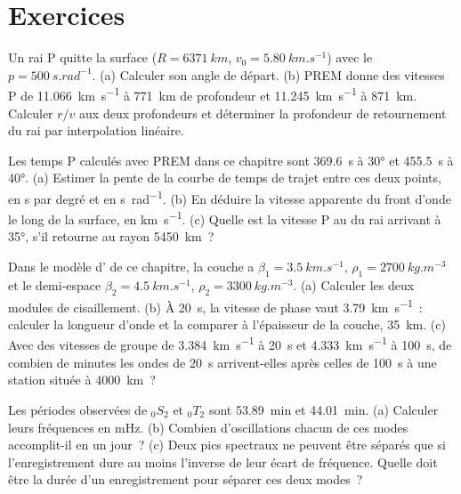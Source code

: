 \section{Exercices}

\begin{exercise}[$\star$]\label{exo:b3:seismology-imaging:1}
Un rai P quitte la surface ($R = \qty{6371}{km}$, $v_0 = \qty{5.80}{km.s^{-1}}$)
avec le  $p = \qty{500}{s.rad^{-1}}$. (a) Calculer son angle de départ.
(b) PREM donne des vitesses P de \qty{11.066}{km.s^{-1}} à \qty{771}{km} de profondeur
et \qty{11.245}{km.s^{-1}} à \qty{871}{km}. Calculer $r/v$ aux deux profondeurs et
déterminer la profondeur de retournement du rai par interpolation linéaire.
\end{exercise}

\begin{exercise}[$\star$]\label{exo:b3:seismology-imaging:2}
Les temps P calculés avec PREM dans ce chapitre sont \qty{369.6}{s} à \ang{30}
et \qty{455.5}{s} à \ang{40}. (a) Estimer la pente de la courbe de temps de trajet
entre ces deux points, en \unit{s} par degré et en \unit{s.rad^{-1}}. (b) En déduire
la vitesse apparente du front d'onde le long de la surface, en
\unit{km.s^{-1}}. (c) Quelle est la vitesse P au  du rai
arrivant à \ang{35}, s'il retourne au rayon \qty{5450}{km}~?
\end{exercise}

\begin{exercise}[$\star$]\label{exo:b3:seismology-imaging:3}
Dans le modèle d' de ce chapitre, la couche a $\beta_1 =
\qty{3.5}{km.s^{-1}}$, $\rho_1 = \qty{2700}{kg.m^{-3}}$ et le demi-espace
$\beta_2 = \qty{4.5}{km.s^{-1}}$, $\rho_2 = \qty{3300}{kg.m^{-3}}$.
(a) Calculer les deux modules de cisaillement. (b) À \qty{20}{s}, la vitesse de phase vaut
\qty{3.79}{km.s^{-1}}~: calculer la longueur d'onde et la comparer à l'épaisseur de la couche,
\qty{35}{km}. (c) Avec des vitesses de groupe de \qty{3.384}{km.s^{-1}} à
\qty{20}{s} et \qty{4.333}{km.s^{-1}} à \qty{100}{s}, de combien de minutes les
ondes de 20~s arrivent-elles après celles de 100~s à une station située à \qty{4000}{km}~?
\end{exercise}

\begin{exercise}[$\star$]\label{exo:b3:seismology-imaging:4}
Les périodes observées de ${}_0S_2$ et ${}_0T_2$ sont \qty{53.89}{min} et
\qty{44.01}{min}. (a) Calculer leurs fréquences en \unit{mHz}. (b) Combien d'oscillations
chacun de ces modes accomplit-il en un jour~? (c) Deux pics spectraux ne peuvent être
séparés que si l'enregistrement dure au moins l'inverse de leur écart de fréquence.
Quelle doit être la durée d'un enregistrement pour séparer ces deux modes~?
\end{exercise}

